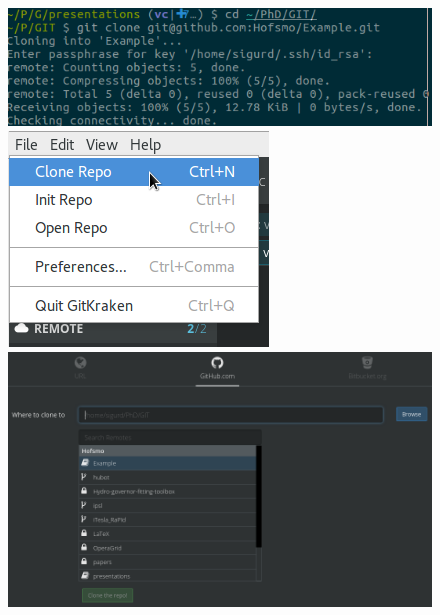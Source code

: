 \begin{frame}
\begin{columns}
\begin{column}{0.6\textwidth}
\begin{figure}
\begin{overprint}
					\includegraphics[width=\textwidth]{./pictures/term_cloned.png}
					\onslide<5,6>\includegraphics[width=\textwidth]{./pictures/kraken_file.png}
					\onslide<7>\includegraphics[width=\textwidth]{./pictures/kraken_example.png}

\end{overprint}
\end{figure}
\end{column}
\end{columns}
\end{frame}
